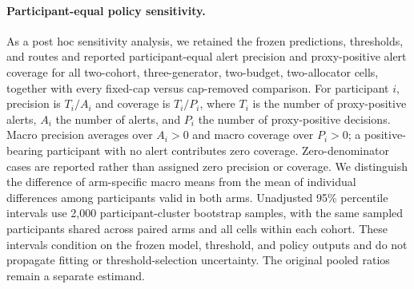 \paragraph{Participant-equal policy sensitivity.}
As a post hoc sensitivity analysis, we retained the frozen predictions, thresholds, and routes and reported participant-equal alert precision and proxy-positive alert coverage for all two-cohort, three-generator, two-budget, two-allocator cells, together with every fixed-cap versus cap-removed comparison. For participant $i$, precision is $T_i/A_i$ and coverage is $T_i/P_i$, where $T_i$ is the number of proxy-positive alerts, $A_i$ the number of alerts, and $P_i$ the number of proxy-positive decisions. Macro precision averages over $A_i>0$ and macro coverage over $P_i>0$; a positive-bearing participant with no alert contributes zero coverage. Zero-denominator cases are reported rather than assigned zero precision or coverage. We distinguish the difference of arm-specific macro means from the mean of individual differences among participants valid in both arms. Unadjusted 95\% percentile intervals use 2,000 participant-cluster bootstrap samples, with the same sampled participants shared across paired arms and all cells within each cohort. These intervals condition on the frozen model, threshold, and policy outputs and do not propagate fitting or threshold-selection uncertainty. The original pooled ratios remain a separate estimand.
